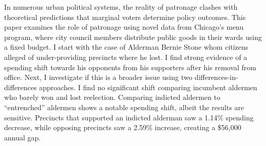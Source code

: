 \begin{spacing}{1.0}
    In numerous urban political systems, the reality of patronage clashes with theoretical predictions that marginal voters determine policy outcomes. This paper examines the role of patronage
    using novel data from Chicago’s menu program, where city council members distribute public
    goods in their wards using a fixed budget. 
    I start with the case of Alderman Bernie Stone whom citizens alleged of under-providing precincts where he lost. 
    I find strong evidence of a spending shift towards his opponents from his supporters after his removal from office. 
    Next, I investigate if this is a broader issue using two differences-in-differences approaches. 
    I find no significant shift comparing incumbent aldermen who barely won and lost reelection. 
    Comparing indicted aldermen to “entrenched” aldermen shows a notable spending shift, albeit the results are sensitive.
    Precincts that supported an indicted alderman saw a 1.14\% spending decrease, while opposing precincts saw a 2.59\% increase, creating a \$56,000 annual gap.
\end{spacing}